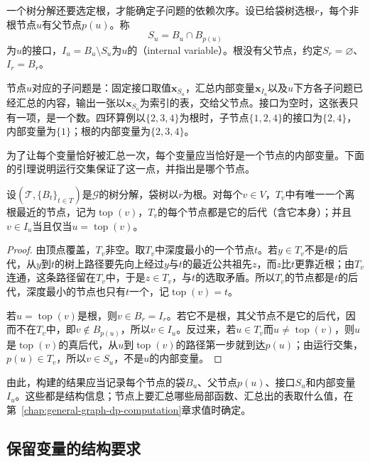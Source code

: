 一个树分解还要选定根，才能确定子问题的依赖次序。设已给袋树选根$r$，每个非根节点$u$有父节点$p(u)$。称
\[
S_u=B_u\cap B_{p(u)}
\]
为$u$的接口，$I_u=B_u\setminus S_u$为$u$的（internal variable）。根没有父节点，约定$S_r=\varnothing$、$I_r=B_r$。

节点$u$对应的子问题是：固定接口取值$\bm x_{S_u}$，汇总内部变量$\bm x_{I_u}$以及$u$下方各子问题已经汇总的内容，输出一张以$\bm x_{S_u}$为索引的表，交给父节点。接口为空时，这张表只有一项，是一个数。四环算例以$\{2,3,4\}$为根时，子节点$\{1,2,4\}$的接口为$\{2,4\}$，内部变量为$\{1\}$；根的内部变量为$\{2,3,4\}$。

为了让每个变量恰好被汇总一次，每个变量应当恰好是一个节点的内部变量。下面的引理说明运行交集保证了这一点，并指出是哪个节点。

\begin{lemma}[每个变量恰在一个袋中作内部变量]
\label{lem:graph-dp-unique-internal}
设$(\mathcal T,\{B_t\}_{t\in T})$是$\mathcal G$的树分解，袋树以$r$为根。对每个$v\in V$，$T_v$中有唯一一个离根最近的节点，记为$\operatorname{top}(v)$，$T_v$的每个节点都是它的后代（含它本身）；并且$v\in I_u$当且仅当$u=\operatorname{top}(v)$。
\end{lemma}

\begin{proof}
由顶点覆盖，$T_v$非空。取$T_v$中深度最小的一个节点$t$。若$y\in T_v$不是$t$的后代，从$y$到$t$的树上路径要先向上经过$y$与$t$的最近公共祖先$z$，而$z$比$t$更靠近根；由$T_v$连通，这条路径留在$T_v$中，于是$z\in T_v$，与$t$的选取矛盾。所以$T_v$的节点都是$t$的后代，深度最小的节点也只有$t$一个，记$\operatorname{top}(v)=t$。

若$u=\operatorname{top}(v)$是根，则$v\in B_r=I_r$。若它不是根，其父节点不是它的后代，因而不在$T_v$中，即$v\notin B_{p(u)}$，所以$v\in I_u$。反过来，若$u\in T_v$而$u\neq\operatorname{top}(v)$，则$u$是$\operatorname{top}(v)$的真后代，从$u$到$\operatorname{top}(v)$的路径第一步就到达$p(u)$；由运行交集，$p(u)\in T_v$，所以$v\in S_u$，不是$u$的内部变量。
\end{proof}

由此，构建的结果应当记录每个节点的袋$B_u$、父节点$p(u)$、接口$S_u$和内部变量$I_u$。这些都是结构信息；节点上要汇总哪些局部函数、汇总出的表取什么值，在第~\ref{chap:general-graph-dp-computation}章求值时确定。

\subsection{保留变量的结构要求}
\label{sec:graph-dp-query-structure}

